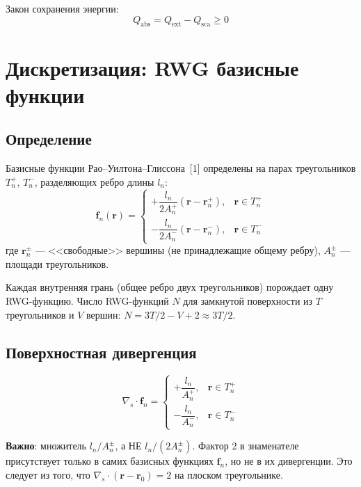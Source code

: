 \documentclass[12pt,a4paper]{article}
\begin{document}
Закон сохранения энергии:
\begin{equation}
  Q_{\mathrm{abs}} = Q_{\mathrm{ext}} - Q_{\mathrm{sca}} \geq 0
\end{equation}


\section{Дискретизация: RWG базисные функции}

\subsection{Определение}

Базисные функции Рао--Уилтона--Глиссона~[1] определены на парах треугольников $T_n^+$, $T_n^-$, разделяющих ребро длины $l_n$:
\begin{equation}
  \mathbf{f}_n(\mathbf{r}) =
  \begin{cases}
    +\dfrac{l_n}{2 A_n^+} (\mathbf{r} - \mathbf{r}_n^+), & \mathbf{r} \in T_n^+ \\[0.7em]
    -\dfrac{l_n}{2 A_n^-} (\mathbf{r} - \mathbf{r}_n^-), & \mathbf{r} \in T_n^-
  \end{cases}
\end{equation}
где $\mathbf{r}_n^\pm$ --- <<свободные>> вершины (не принадлежащие общему ребру), $A_n^\pm$ --- площади треугольников.

Каждая внутренняя грань (общее ребро двух треугольников) порождает одну RWG-функцию. Число RWG-функций $N$ для замкнутой поверхности из $T$ треугольников и $V$ вершин: $N = 3T/2 - V + 2 \approx 3T/2$.

\subsection{Поверхностная дивергенция}

\begin{equation}
  \nabla_s \cdot \mathbf{f}_n =
  \begin{cases}
    +\dfrac{l_n}{A_n^+}, & \mathbf{r} \in T_n^+ \\[0.5em]
    -\dfrac{l_n}{A_n^-}, & \mathbf{r} \in T_n^-
  \end{cases}
\end{equation}

\textbf{Важно}: множитель $l_n / A_n^\pm$, а НЕ $l_n / (2A_n^\pm)$. Фактор 2 в знаменателе присутствует только в самих базисных функциях $\mathbf{f}_n$, но не в их дивергенции. Это следует из того, что $\nabla_s \cdot (\mathbf{r} - \mathbf{r}_0) = 2$ на плоском треугольнике.
\end{document}
